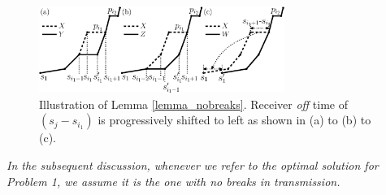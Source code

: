 \begin{figure}[htb]
  \centering
  \centerline{\includegraphics[width=8cm]{Lemma2.eps}}
\caption{Illustration of Lemma \ref{lemma_nobreaks}. Receiver \textit{off} time of $(s_{j}-s_{i_1})$ is progressively shifted to left as shown in (a) to (b) to (c).}\label{fig_Lemma2}
\end{figure}
\textit{In the subsequent discussion, whenever we refer to the optimal solution for Problem 1, we assume it is the one with no breaks in transmission.}
%
%
%
%
%

